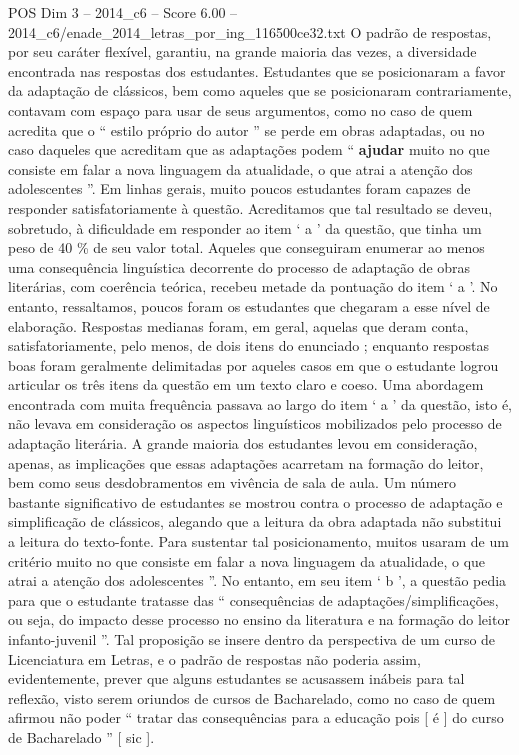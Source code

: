 \begin{textsample}{POS Dim 3 – 2014\_c6 – Score 6.00 – 2014\_c6/enade\_2014\_letras\_por\_ing\_116500ce32.txt}
O padrão de respostas, por seu caráter flexível, garantiu, na grande maioria das vezes, a diversidade encontrada nas respostas dos estudantes.
Estudantes que se posicionaram a favor da adaptação de clássicos, bem como aqueles que se posicionaram contrariamente, contavam com espaço para usar de seus argumentos, como no caso de quem acredita que o “ estilo próprio do autor ” se perde em obras adaptadas, ou no caso daqueles que acreditam que as adaptações podem “ \textbf{ajudar} muito no que consiste em falar a nova linguagem da atualidade, o que atrai a atenção dos adolescentes ”.
Em linhas gerais, muito poucos estudantes foram capazes de responder satisfatoriamente à questão.
Acreditamos que tal resultado se deveu, sobretudo, à dificuldade em responder ao item ‘ a ’ da questão, que tinha um peso de 40 \% de seu valor total.
Aqueles que conseguiram enumerar ao menos uma consequência linguística decorrente do processo de adaptação de obras literárias, com coerência teórica, recebeu metade da pontuação do item ‘ a ’.
No entanto, ressaltamos, poucos foram os estudantes que chegaram a esse nível de elaboração.
Respostas medianas foram, em geral, aquelas que deram conta, satisfatoriamente, pelo menos, de dois itens do enunciado ; enquanto respostas boas foram geralmente delimitadas por aqueles casos em que o estudante logrou articular os três itens da questão em um texto claro e coeso.
Uma abordagem encontrada com muita frequência passava ao largo do item ‘ a ’ da questão, isto é, não levava em consideração os aspectos linguísticos mobilizados pelo processo de adaptação literária.
A grande maioria dos estudantes levou em consideração, apenas, as implicações que essas adaptações acarretam na formação do leitor, bem como seus desdobramentos em vivência de sala de aula.
Um número bastante significativo de estudantes se mostrou contra o processo de adaptação e simplificação de clássicos, alegando que a leitura da obra adaptada não substitui a leitura do texto-fonte.
Para sustentar tal posicionamento, muitos usaram de um critério muito no que consiste em falar a nova linguagem da atualidade, o que atrai a atenção dos adolescentes ”.
No entanto, em seu item ‘ b ’, a questão pedia para que o estudante tratasse das “ consequências de adaptações/simplificações, ou seja, do impacto desse processo no ensino da literatura e na formação do leitor infanto-juvenil ”.
Tal proposição se insere dentro da perspectiva de um curso de Licenciatura em Letras, e o padrão de respostas não poderia assim, evidentemente, prever que alguns estudantes se acusassem inábeis para tal reflexão, visto serem oriundos de cursos de Bacharelado, como no caso de quem afirmou não poder “ tratar das consequências para a educação pois [ é ] do curso de Bacharelado ” [ sic ].

\end{textsample}
